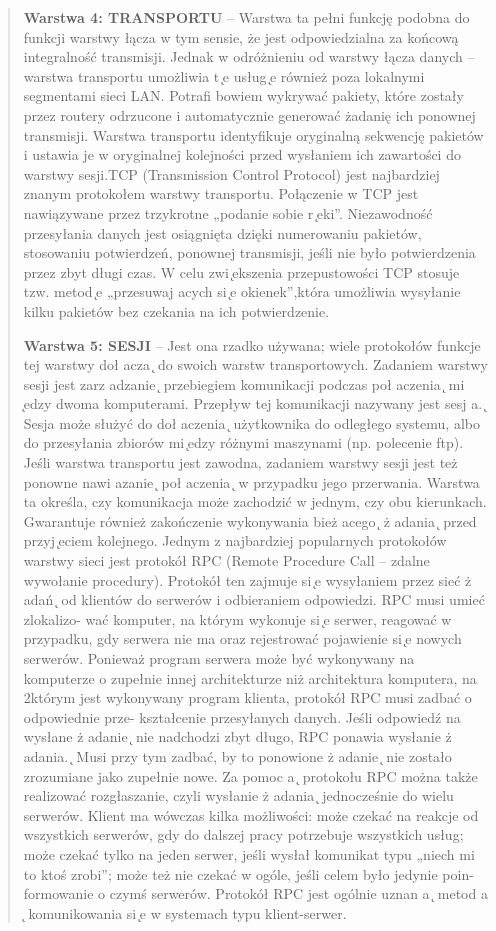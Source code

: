 \documentclass[a4paper,11pt]{article}
\begin{document}
\begin{verse}
\textbf{Warstwa 4: TRANSPORTU} – Warstwa ta pełni funkcję podobna do funkcji warstwy łącza w tym sensie, że jest odpowiedzialna za końcową integralność transmisji. Jednak w odróżnieniu od warstwy łącza danych – warstwa transportu umożliwia t ̨e usług ̨e również poza lokalnymi segmentami sieci LAN. Potrafi bowiem wykrywać pakiety, które zostały przez routery odrzucone i automatycznie generować żadanię ich ponownej transmisji. Warstwa transportu identyfikuje oryginalną sekwencję pakietów i ustawia je w oryginalnej kolejności przed wysłaniem ich zawartości do warstwy sesji.TCP (Transmission Control Protocol) jest najbardziej znanym protokołem warstwy transportu. Połączenie w TCP jest nawiązywane przez trzykrotne „podanie sobie r ̨eki”. Niezawodność przesyłania danych jest osiągnięta dzięki numerowaniu pakietów, stosowaniu potwierdzeń, ponownej transmisji, jeśli nie było potwierdzenia przez zbyt długi czas. W celu zwi ̨ekszenia przepustowości TCP stosuje tzw. metod ̨e „przesuwaj acych si ̨e okienek”,która umożliwia wysyłanie kilku pakietów bez czekania na ich potwierdzenie.

\textbf{Warstwa 5: SESJI} – Jest ona rzadko używana; wiele protokołów funkcje tej warstwy doł acza
̨
do swoich warstw transportowych. Zadaniem warstwy sesji jest zarz adzanie
̨
przebiegiem
komunikacji podczas poł aczenia
̨
mi ̨edzy dwoma komputerami. Przepływ tej komunikacji
nazywany jest sesj a.  ̨ Sesja może służyć do doł aczenia
̨
użytkownika do odległego systemu,
albo do przesyłania zbiorów mi ̨edzy różnymi maszynami (np. polecenie ftp). Jeśli warstwa
transportu jest zawodna, zadaniem warstwy sesji jest też ponowne nawi azanie
̨
poł aczenia
̨
w przypadku jego przerwania. Warstwa ta określa, czy komunikacja może zachodzić w
jednym, czy obu kierunkach. Gwarantuje również zakończenie wykonywania bież acego
̨
ż adania
̨
przed przyj ̨eciem kolejnego.
Jednym z najbardziej popularnych protokołów warstwy sieci jest protokół RPC (Remote
Procedure Call – zdalne wywołanie procedury). Protokół ten zajmuje si ̨e wysyłaniem przez
sieć ż adań
̨
od klientów do serwerów i odbieraniem odpowiedzi. RPC musi umieć zlokalizo-
wać komputer, na którym wykonuje si ̨e serwer, reagować w przypadku, gdy serwera nie ma
oraz rejestrować pojawienie si ̨e nowych serwerów. Ponieważ program serwera może być
wykonywany na komputerze o zupełnie innej architekturze niż architektura komputera, na
2którym jest wykonywany program klienta, protokół RPC musi zadbać o odpowiednie prze-
kształcenie przesyłanych danych. Jeśli odpowiedź na wysłane ż adanie
̨
nie nadchodzi zbyt
długo, RPC ponawia wysłanie ż adania.
̨
Musi przy tym zadbać, by to ponowione ż adanie
̨
nie
zostało zrozumiane jako zupełnie nowe. Za pomoc a  ̨ protokołu RPC można także realizować
rozgłaszanie, czyli wysłanie ż adania
̨
jednocześnie do wielu serwerów. Klient ma wówczas
kilka możliwości: może czekać na reakcje od wszystkich serwerów, gdy do dalszej pracy
potrzebuje wszystkich usług; może czekać tylko na jeden serwer, jeśli wysłał komunikat
typu „niech mi to ktoś zrobi”; może też nie czekać w ogóle, jeśli celem było jedynie poin-
formowanie o czymś serwerów. Protokół RPC jest ogólnie uznan a  ̨ metod a  ̨ komunikowania
si ̨e w systemach typu klient-serwer.


\end{verse}
\end{document}
